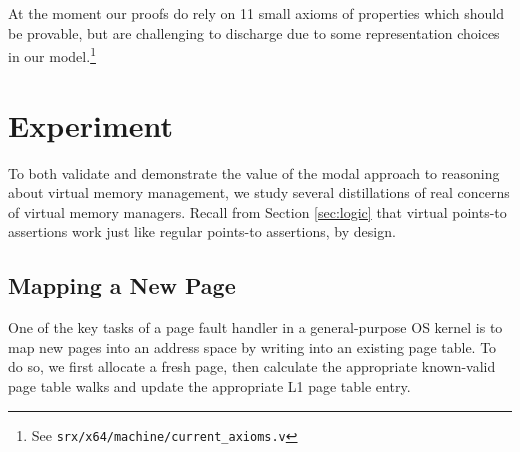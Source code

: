\documentclass[acmsmall,screen,nonacm]{acmart}
\begin{document}
At the moment our proofs do rely on 11 small axioms of properties which should be provable, but
are challenging to discharge due to some representation choices in our model.\footnote{See \lstinline|srx/x64/machine/current_axioms.v|}
%
%
%
\section{Experiment}
\label{sec:experiment}
To both validate and demonstrate the value of the modal approach to reasoning about virtual memory management, we study several
distillations of real concerns of virtual memory managers.
Recall from Section \ref{sec:logic} that virtual points-to assertions work just like regular points-to assertions, by design.

%
%
%
%
%
%
%
%
%
%
\subsection{Mapping a New Page}
One of the key tasks of a page fault handler in a general-purpose OS kernel is
to map new pages into an address space by writing into an existing page table.
To do so, we first allocate a fresh page, then calculate the appropriate
known-valid page table walks and update the appropriate L1 page table entry.
\newcommand{\fpaddr}{\texttt{fpaddr}}
\newcommand{\specline}[1]{{\color{blue}\left\{#1\right\}}}
\end{document}

